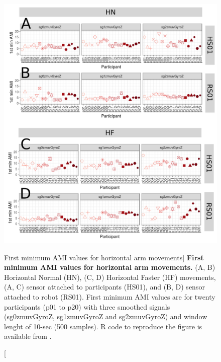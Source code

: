 \begin{figure}
\centering
\includegraphics[width=1.0\textwidth]{ami_aHw10}
	\caption
	[First minimum AMI values for horizontal arm movements]{
	{\bf First minimum AMI values for horizontal arm movements.}
		(A, B) Horizontal Normal (HN), (C, D) Horizontal Faster (HF) 
		movements,
		(A, C) sensor attached to participants (HS01), and
		(B, D) sensor attached to robot (RS01).
		First minimum AMI values are for twenty participants 
		(p01 to p20) with three smoothed signals (sg0zmuvGyroZ, 
		sg1zmuvGyroZ and sg2zmuvGyroZ) and  window lenght of 
		10-sec (500 samples).
		R code to reproduce the figure is available 
		from \cite{hwum2018}.
        }
    \label{fig:amiH}
\end{figure}

